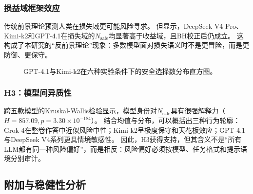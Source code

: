 \subsubsection{损益域框架效应}

传统前景理论预测人类在损失域更可能风险寻求。
但显示，DeepSeek-V4-Pro、Kimi-k2和GPT-4.1在损失域的$N_{\text{safe}}$均显著高于收益域，且BH校正后仍成立。
这构成了本研究的“反前景理论”现象：多数模型面对损失语义时不是更冒险，而是更防御、更保守。



\begin{figure}[!ht]
  \centering
  \begin{minipage}{\linewidth}
    \centering
    \makebox[\linewidth][c]{\hspace*{-0.130\linewidth}\resizebox{0.98\linewidth}{!}{}}
    \label{fig:gpt_distribution}
  \end{minipage}
  \vspace{0.1em}

  \begin{minipage}{\linewidth}
    \centering
    \makebox[\linewidth][c]{\hspace*{-0.130\linewidth}\resizebox{0.98\linewidth}{!}{}}
    \label{fig:kimi_distribution}
  \end{minipage}
  \caption{GPT-4.1与Kimi-k2在六种实验条件下的安全选择数分布直方图。}
  \label{fig:domain_distributions}
\end{figure}

\subsubsection{H3：模型间异质性}

跨五款模型的Kruskal-Wallis检验显示，模型身份对$N_{\text{safe}}$具有很强解释力（$H=857.09,p=3.30\times10^{-184}$）。
结合均值与分布，可以概括出三种行为轮廓：Grok-4在整卷作答中近似风险中性；Kimi-k2呈极度保守和天花板效应；GPT-4.1与DeepSeek V4系列更具情境敏感性。
因此，H3获得支持，但其含义不是“所有LLM都有同一种风险偏好”，而是相反：风险偏好必须按模型、任务格式和提示语境分别审计。

\subsection{附加与稳健性分析}


